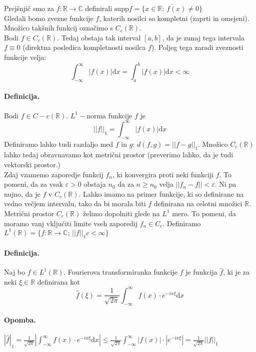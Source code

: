 \documentclass[a4paper]{article}
\newcommand{\dif}{\mathrm{d}}
\newcommand{\C}{\mathbb{C}}
\newcommand{\R}{\mathbb{R}}
\newcommand{\fn}[3]{{#1}\colon {#2} \rightarrow {#3}}
\begin{document}
Prejšnjič smo za $\fn{f}{\R}{\C}$ definirali $\mathrm{supp}f = \overline{\{x\in\R:\,f(x)\neq0\}}$ \\
Gledali bomo zvezne funkcije $f$, katerih nosilci so kompletni (zaprti in omejeni). Množico takšnih funkcij
označimo s $C_c(\R)$. \\[3mm]
Bodi $f \in C_c(\R)$. Tedaj obstaja tak interval $[a, b]$, da je zunaj tega intervala $f \equiv 0$ (direktna posledica kompletnosti nosilca $f$). Poljeg tega zaradi zveznosti funkcije velja:
$$\int_{-\infty}^{\infty} |f(x)|\dif x = \int_{a}^{b}|f(x)|\dif x < \infty$$
\paragraph{Definicija.} Bodi $f \in C-c(\R)$. $L^1-$norma funkcije $f$ je
$$||f||_1 = \int_{-\infty}^{\infty} |f(x)|\dif x$$
Definiramo lahko tudi razdaljo med $f$ in $g$: $d(f, g) = ||f - g||_1$.
Množico $C_c(\R)$ lahko tedaj obravnavamo kot metrični prostor (preverimo lahko, da je tudi vektorski prostor.) \\[3mm]
Zdaj vzamemo zaporedje funkcij $f_n$, ki konvergira proti neki funkciji $f$. To pomeni, da za vsak $\varepsilon>0$ obstaja $n_0$
da za $n \geq n_0$ velja $||f_n - f|| < \varepsilon$. Ni pa nujno, da je $f$ v $C_c(\R)$. Lahko imamo na primer funkcije, ki so definirane na vedno večjem intervalu, tako da bi morala biti $f$ definirana na celotni množici $\R$. \\[3mm]
Metrični prostor $C_c(\R)$ želimo dopolniti glede na $L^1$ mero. To pomeni, da moramo vanj vključiti limite vseh zaporedij $f_n \in C_c$. Definiramo
$L^1(\R) = \{\fn{f}{\R}{\C};\,||f||_1c< \infty\}$
\paragraph{Definicija.} Naj bo $f \in L^1(\R)$. Fourierova transformiranka funkcije $f$ je funkcija $\hat{f}$, ki je za neki $\xi \in \R$ definirana kot
$$\hat{f}(\xi) = \frac{1}{\sqrt{2\pi}}\int_{-\infty}^{\infty}f(x)\cdot e^{-ix\xi}\dif x$$
\paragraph{Opomba.} $\displaystyle{|\hat{f}|_1 =\frac{1}{\sqrt{2\pi}}\left|\int_{-\infty}^{\infty}f(x)\cdot e^{-ix\xi}\dif x\right| \leq \frac{1}{\sqrt{2\pi}}\int_{-\infty}^{\infty}|f(x)|\cdot |e^{-ix\xi}|} = \frac{1}{\sqrt{2\pi}}||f||_1$
\end{document}
